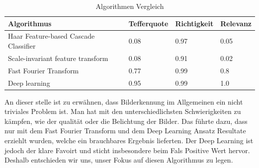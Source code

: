 \begin{table}[H]
    \begin{tabular}{|l|l|l|l|}
    \hline    
    \rowcolor{lightblue}
	Algorithmus & Tefferquote & Richtigkeit & Relevanz \\ \hline
	Haar Feature-based Cascade Classifier & 0.08 & 0.97 & 0.05 \\ \hline
	Scale-invariant feature transform & 0.08 & 0.91 & 0.02 \\ \hline
	Fast Fourier Transform & 0.77 & 0.99 & 0.8 \\ \hline
	Deep learning & 0.95 & 0.99 & 1.0 \\ \hline
    \end{tabular}
    \caption[Algorithmen Vergleich]{Algorithmen Vergleich}
\end{table}

An dieser stelle ist zu erwähnen, dass Bilderkennung im Allgemeinen ein nicht triviales Problem ist. Man hat mit den unterschiedlichsten Schwierigkeiten zu kämpfen, wie der qualität oder die Belichtung der Bilder. Das führte dazu, dass nur mit dem Fast Fourier Transform und dem Deep Learning Ansatz Resultate erziehlt wurden, welche ein brauchbares Ergebnis lieferten. Der Deep Learning ist jedoch der klare Favoirt und sticht insbesondere beim Fals Positive Wert hervor. Deshalb entschieden wir uns, unser Fokus auf diesen Algorithmus zu legen. 




